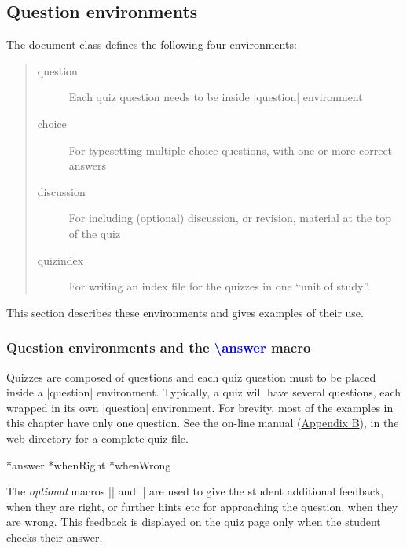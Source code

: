 \documentclass[svgnames]{article}
\makeatletter
\newcommand\macroIndex[1]{%
  \lowercase{\def\temp{#1}}%
  \expandafter\index\expandafter{\temp@\textbackslash#1}%
}
\makeatother
\begin{document}
\subsection{Question environments}

The \WebQuiz document class defines the following four environments:
\begin{quote}
  \begin{description}
    \item[question] Each quiz question needs to be inside
    \LatexCode|question| environment
    \item[choice] For typesetting multiple choice questions, with
    one or more correct answers
    \item[discussion] For including (optional) discussion, or revision,
    material at the top of the quiz
    \item[quizindex] For writing an index file for the quizzes in
    one ``unit of study''.
  \end{description}
\end{quote}
This section describes these environments and gives examples
of their use.

\subsubsection{Question environments and the \textcolor{blue}{\textbackslash answer} macro}

Quizzes are composed of questions and each quiz question must to be
placed inside a \LatexCode|question| environment. Typically, a quiz will have
several questions, each wrapped in its own \LatexCode|question| environment.
For brevity, most of the examples in this chapter have only one
question. See the on-line manual (\hyperref[S:online]{Appendix B}), in the \WebQuiz web
directory for a complete quiz file.

  \macroIndex{answer}*{answer}
  *{whenRight}
  *{whenWrong}

  The \textit{optional} macros \LatexCode|\whenRight| and
  \LatexCode|\whenWrong| are used to give the student additional
  feedback, when they are right, or further hints etc for approaching
  the question, when they are wrong. This feedback is displayed on the
  quiz page only when the student checks their answer.
\end{document}

